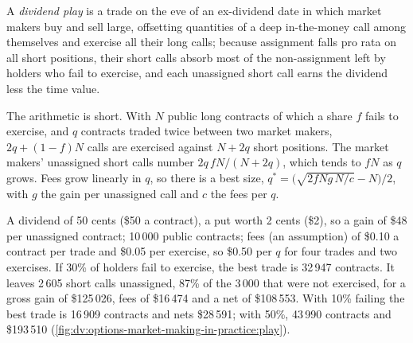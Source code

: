 \begin{definition}\label{def:dv:options-market-making-in-practice:play}
A \emph{dividend play} is a trade on the eve of an ex-dividend date in which market makers buy and sell large, offsetting quantities of a
deep in-the-money call among themselves and exercise all their long calls; because assignment falls pro rata on all short positions, their short calls absorb
most of the non-assignment left by holders who fail to exercise, and each unassigned short call earns the dividend less the time value.
\end{definition}

The arithmetic is short. With $N$ public long contracts of which a share $f$ fails to exercise, and $q$ contracts traded twice between two market makers,
$2q+(1-f)N$ calls are exercised against $N+2q$ short positions. The market makers' unassigned short calls number $2q\,fN/(N+2q)$, which tends to $fN$ as
$q$ grows. Fees grow linearly in $q$, so there is a best size, $q^*=\bigl(\sqrt{2fNg\,N/c}-N\bigr)/2$, with $g$ the gain per unassigned call and $c$ the fees
per $q$.

\begin{example}\label{ex:dv:options-market-making-in-practice:play}
A dividend of 50 cents (\$50 a contract), a put worth 2 cents (\$2), so a gain of \$48 per unassigned contract; 10\,000 public contracts; fees (an assumption)
of \$0.10 a contract per trade and \$0.05 per exercise, so \$0.50 per $q$ for four trades and two exercises. If 30\% of holders fail to exercise, the best trade
is 32\,947 contracts. It leaves 2\,605 short calls unassigned, 87\% of the 3\,000 that were not exercised, for a gross gain of \$125\,026, fees of \$16\,474 and a net
of \$108\,553. With 10\% failing the best trade is 16\,909 contracts and nets \$28\,591; with 50\%, 43\,990 contracts and \$193\,510
(\cref{fig:dv:options-market-making-in-practice:play}).
\end{example}

